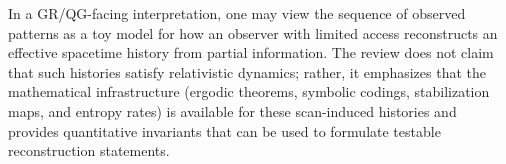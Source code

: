 In a GR/QG-facing interpretation, one may view the sequence of observed patterns as a toy model for how an observer with limited access reconstructs an effective spacetime history from partial information. The review does not claim that such histories satisfy relativistic dynamics; rather, it emphasizes that the mathematical infrastructure (ergodic theorems, symbolic codings, stabilization maps, and entropy rates) is available for these scan-induced histories and provides quantitative invariants that can be used to formulate testable reconstruction statements.

